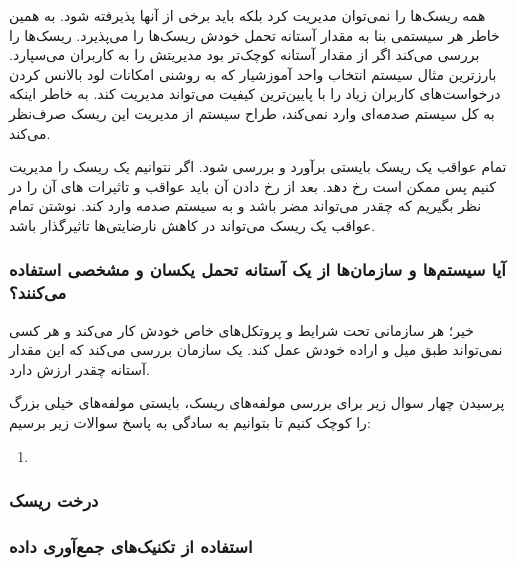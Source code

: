 همه ریسک‌ها را نمی‌توان مدیریت کرد بلکه باید برخی از آنها پذیرفته شود. به همین
خاطر هر سیستمی بنا به مقدار آستانه تحمل خودش ریسک‌ها را می‌پذیرد. ریسک‌ها را
بررسی می‌کند اگر از مقدار آستانه کوچک‌تر بود مدیریتش را به کاربران می‌سپارد.
بارزترین مثال سیستم انتخاب واحد آموزشیار که به روشنی امکانات لود بالانس کردن
درخواست‌های کاربران زیاد را با پایین‌ترین کیفیت می‌تواند مدیریت کند. به خاطر
اینکه به کل سیستم صدمه‌ای وارد نمی‌کند، طراح سیستم از مدیریت این ریسک صرف‌نظر
می‌کند.

تمام عواقب  یک ریسک بایستی برآورد و بررسی شود. اگر نتوانیم یک
ریسک را مدیریت کنیم پس ممکن است رخ دهد. بعد از رخ دادن آن باید عواقب و تاثیرات
های آن را در نظر بگیریم که چقدر می‌تواند مضر باشد و به سیستم
صدمه وارد کند. نوشتن تمام عواقب یک ریسک می‌تواند در کاهش نارضایتی‌ها تاثیرگذار
باشد.

\subsubsection*{آیا سیستم‌ها و سازمان‌ها از یک آستانه تحمل یکسان و مشخصی استفاده
می‌کنند؟}

خیر؛ هر سازمانی تحت شرایط و پروتکل‌های خاص خودش کار می‌کند و هر کسی نمی‌تواند
طبق میل و اراده خودش عمل کند. یک سازمان بررسی می‌کند که این مقدار آستانه چقدر
ارزش دارد.

پرسیدن چهار سوال زیر برای بررسی مولفه‌های ریسک، بایستی مولفه‌های خیلی بزرگ را
کوچک کنیم تا بتوانیم به سادگی به پاسخ سوالات زیر برسیم:

\begin{enumerate}
    \item 
\end{enumerate}

\subsubsection{درخت ریسک}

\subsubsection{استفاده از تکنیک‌های جمع‌آوری داده}
